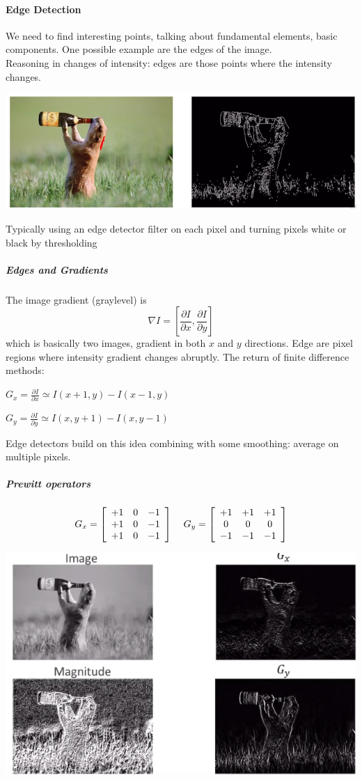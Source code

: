 \documentclass[10pt]{report}
\begin{document}
\paragraph{Edge Detection} We need to find interesting points, talking about fundamental elements, basic components. One possible example are the edges of the image.\\
Reasoning in changes of intensity: edges are those points where the intensity changes.\begin{center}
	\includegraphics[scale=0.5]{4.png}
\end{center}
Typically using an edge detector filter on each pixel and turning pixels white or black by thresholding
\subparagraph{Edges and Gradients} The image gradient (graylevel) is $$\nabla I = \left[\frac{\partial I}{\partial x},\frac{\partial I}{\partial y}\right]$$ which is basically two images, gradient in both $x$ and $y$ directions. Edge are pixel regions where intensity gradient changes abruptly. The return of finite difference methods:
\begin{list}{}{}
	\item $G_x = \frac{\partial I}{\partial x} \simeq I(x+1,y)-I(x-1,y)$
	\item $G_y = \frac{\partial I}{\partial y} \simeq I(x,y+1)-I(x,y-1)$
\end{list}
\pagebreak
Edge detectors build on this idea combining with some smoothing: average on multiple pixels.
\subparagraph{Prewitt operators}
$$G_x = \left[\begin{array}{c c c }
+1&0&-1\\
+1&0&-1\\
+1&0&-1
\end{array}\right]\:\:\:\:\:G_y = \left[\begin{array}{c c c }
+1&+1&+1\\
0&0&0\\
-1&-1&-1
\end{array}\right]$$
\begin{center}
	\includegraphics[scale=0.5]{5.png}
\end{center}
\end{document}
